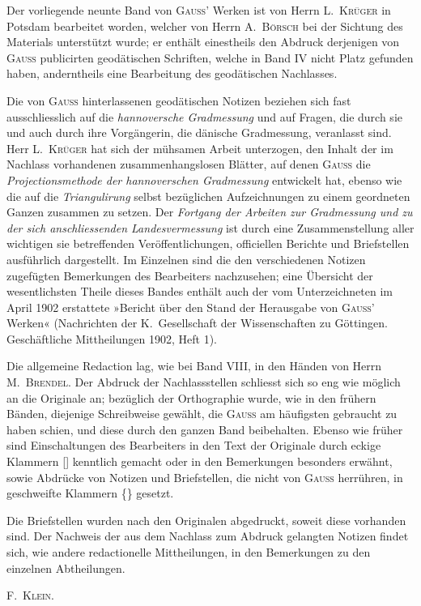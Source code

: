 Der vorliegende neunte Band von \textsc{Gauss}' Werken ist von Herrn L.~\textsc{Krüger} in Potsdam bearbeitet worden, welcher von Herrn A.~\textsc{Börsch} bei der Sichtung des Materials unterstützt wurde; er enthält einestheils den Abdruck derjenigen von \textsc{Gauss} publicirten geodätischen Schriften, welche in Band IV nicht Platz gefunden haben, anderntheils eine Bearbeitung des geodätischen Nachlasses.

Die von \textsc{Gauss} hinterlassenen geodätischen Notizen beziehen sich fast ausschliesslich auf die \textit{hannoversche Gradmessung} und auf Fragen, die durch sie und auch durch ihre Vorgängerin, die dänische Gradmessung, veranlasst sind. Herr L.~\textsc{Krüger} hat sich der mühsamen Arbeit unterzogen, den Inhalt der im Nachlass vorhandenen zusammenhangslosen Blätter, auf denen \textsc{Gauss} die \textit{Projectionsmethode der hannoverschen Gradmessung} entwickelt hat, ebenso wie die auf die \textit{Triangulirung} selbst bezüglichen Aufzeichnungen zu einem geordneten Ganzen zusammen zu setzen. Der \textit{Fortgang der Arbeiten zur Gradmessung und zu der sich anschliessenden Landesvermessung} ist durch eine Zusammenstellung aller wichtigen sie betreffenden Veröffentlichungen, officiellen Berichte und Briefstellen ausführlich dargestellt. Im Einzelnen sind die den verschiedenen Notizen zugefügten Bemerkungen des Bearbeiters nachzusehen; eine Übersicht der wesentlichsten Theile dieses Bandes enthält auch der vom Unterzeichneten im April 1902 erstattete »Bericht über den Stand der Herausgabe von \textsc{Gauss}' Werken« (Nachrichten der K.~Gesellschaft der Wissenschaften zu Göttingen. Geschäftliche Mittheilungen 1902, Heft 1).

Die allgemeine Redaction lag, wie bei Band VIII, in den Händen von Herrn M.~\textsc{Brendel}. Der Abdruck der Nachlassstellen schliesst sich so eng wie möglich an die Originale an; bezüglich der Orthographie wurde, wie in den frühern Bänden, diejenige Schreibweise gewählt, die \textsc{Gauss} am häufigsten gebraucht zu haben schien, und diese durch den ganzen Band beibehalten. Ebenso wie früher sind Einschaltungen des Bearbeiters in den Text der Originale durch eckige Klammern [] kenntlich gemacht oder in den Bemerkungen besonders erwähnt, sowie Abdrücke von Notizen und Briefstellen, die nicht von \textsc{Gauss} herrühren, in geschweifte Klammern \{\} gesetzt.

Die Briefstellen wurden nach den Originalen abgedruckt, soweit diese vorhanden sind. Der Nachweis der aus dem Nachlass zum Abdruck gelangten Notizen findet sich, wie andere redactionelle Mittheilungen, in den Bemerkungen zu den einzelnen Abtheilungen.\par
\hfill F.~\textsc{Klein.}\hspace*{\parindent}\par


